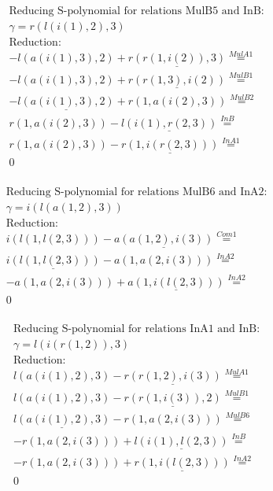 \documentclass[11pt]{amsart}
\begin{document}
\begin{align*} 
& \text{Reducing S-polynomial for relations MulB5 and InB:} \\ 
& \gamma = r(l(i(1),2),3) \\ 
& \text{Reduction}: \\& - l(a(i(1),3),2) + \underline{r(r(1,i(2)),3)} \stackrel{ MulA1 }{=}  \\ 
& - l(a(i(1),3),2) + \underline{r(r(1,3),i(2))} \stackrel{ MulB1 }{=}  \\ 
& - \underline{l(a(i(1),3),2)} + r(1,a(i(2),3)) \stackrel{ MulB2 }{=}  \\ 
&r(1,a(i(2),3)) - \underline{l(i(1),r(2,3))} \stackrel{ InB }{=}  \\ 
&r(1,a(i(2),3)) - \underline{r(1,i(r(2,3)))} \stackrel{ InA1 }{=}  \\ 
&0\\ 
\end{align*} 
 
\begin{align*} 
& \text{Reducing S-polynomial for relations MulB6 and InA2:} \\ 
& \gamma = i(l(a(1,2),3)) \\ 
& \text{Reduction}: \\&i(l(1,l(2,3))) - \underline{a(a(1,2),i(3))} \stackrel{ Com1 }{=}  \\ 
&\underline{i(l(1,l(2,3)))} - a(1,a(2,i(3))) \stackrel{ InA2 }{=}  \\ 
& - a(1,a(2,i(3))) + \underline{a(1,i(l(2,3)))} \stackrel{ InA2 }{=}  \\ 
&0\\ 
\end{align*} 
 
\begin{align*} 
& \text{Reducing S-polynomial for relations InA1 and InB:} \\ 
& \gamma = l(i(r(1,2)),3) \\ 
& \text{Reduction}: \\&l(a(i(1),2),3) - \underline{r(r(1,2),i(3))} \stackrel{ MulA1 }{=}  \\ 
&l(a(i(1),2),3) - \underline{r(r(1,i(3)),2)} \stackrel{ MulB1 }{=}  \\ 
&\underline{l(a(i(1),2),3)} - r(1,a(2,i(3))) \stackrel{ MulB6 }{=}  \\ 
& - r(1,a(2,i(3))) + \underline{l(i(1),l(2,3))} \stackrel{ InB }{=}  \\ 
& - r(1,a(2,i(3))) + \underline{r(1,i(l(2,3)))} \stackrel{ InA2 }{=}  \\ 
&0\\ 
\end{align*} 
 
\end{document}
